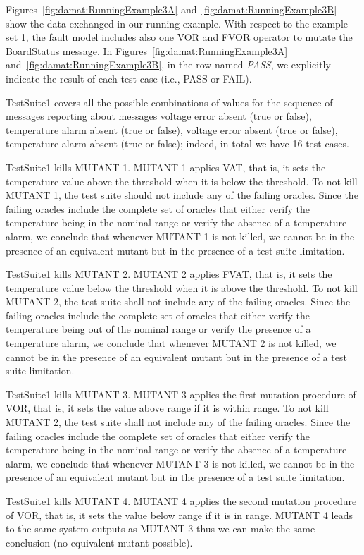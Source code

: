 Figures~\ref{fig:damat:RunningExample3A} and~\ref{fig:damat:RunningExample3B} show the data exchanged in our running example. With respect to the example set 1, the fault model includes also one VOR and FVOR operator to mutate the BoardStatus message. In Figures~\ref{fig:damat:RunningExample3A} and~\ref{fig:damat:RunningExample3B}, in the row named \emph{PASS}, we explicitly indicate the result of each test case (i.e., PASS or FAIL).

TestSuite1 covers all the possible combinations of values for the sequence of messages reporting about messages voltage error absent (true or false), temperature alarm absent (true or false), voltage error absent (true or false), temperature alarm absent (true or false); indeed, in total we have 16 test cases.

TestSuite1 kills MUTANT 1. MUTANT 1 applies VAT, that is, it sets the temperature value above the threshold when it is below the threshold. To not kill MUTANT 1, the test suite should not include any of the failing oracles. Since the failing oracles include the complete set of oracles that either verify the temperature being in the nominal range or verify the absence of a temperature alarm, we conclude that whenever MUTANT 1 is not killed, we cannot be in the presence of an equivalent mutant but in the presence of a test suite limitation.

TestSuite1 kills MUTANT 2. MUTANT 2 applies FVAT, that is, it sets the temperature value below the threshold when it is above the threshold. To not kill MUTANT 2, the test suite shall not include any of the failing oracles. Since the failing oracles include the complete set of oracles that either verify the temperature being out of the nominal range or verify the presence of a temperature alarm, we conclude that whenever MUTANT 2 is not killed, we cannot be in the presence of an equivalent mutant but in the presence of a test suite limitation.

TestSuite1 kills MUTANT 3. MUTANT 3 applies the first mutation procedure of VOR, that is, it sets the value above range if it is within range. To not kill MUTANT 2, the test suite shall not include any of the failing oracles. Since the failing oracles include the complete set of oracles that either verify the temperature being in the nominal range or verify the absence of a temperature alarm, we conclude that whenever MUTANT 3 is not killed, we cannot be in the presence of an equivalent mutant but in the presence of a test suite limitation.

TestSuite1 kills MUTANT 4. MUTANT 4 applies the second mutation procedure of VOR, that is, it sets the value below range if it is in range. MUTANT 4 leads to the same system outputs as MUTANT 3 thus we can make the same conclusion (no equivalent mutant possible).

